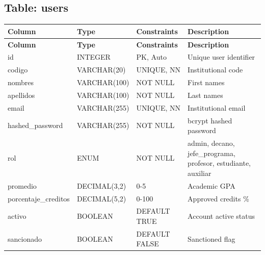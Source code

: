 \documentclass[12pt,a4paper]{report}
\begin{document}
\subsection{Table: users}
\begin{longtable}{|p{3.5cm}|p{2.5cm}|p{2cm}|p{5.5cm}|}
\hline
\textbf{Column} & \textbf{Type} & \textbf{Constraints} & \textbf{Description} \\
\hline
\endfirsthead
\hline \textbf{Column} & \textbf{Type} & \textbf{Constraints} & \textbf{Description} \\ \hline \endhead
id & INTEGER & PK, Auto & Unique user identifier \\
\hline
codigo & VARCHAR(20) & UNIQUE, NN & Institutional code \\
\hline
nombres & VARCHAR(100) & NOT NULL & First names \\
\hline
apellidos & VARCHAR(100) & NOT NULL & Last names \\
\hline
email & VARCHAR(255) & UNIQUE, NN & Institutional email \\
\hline
hashed\_password & VARCHAR(255) & NOT NULL & bcrypt hashed password \\
\hline
rol & ENUM & NOT NULL & admin, decano, jefe\_programa, profesor, estudiante, auxiliar \\
\hline
promedio & DECIMAL(3,2) & 0-5 & Academic GPA \\
\hline
porcentaje\_creditos & DECIMAL(5,2) & 0-100 & Approved credits \% \\
\hline
activo & BOOLEAN & DEFAULT TRUE & Account active status \\
\hline
sancionado & BOOLEAN & DEFAULT FALSE & Sanctioned flag \\
\hline
\end{longtable}
\end{document}
